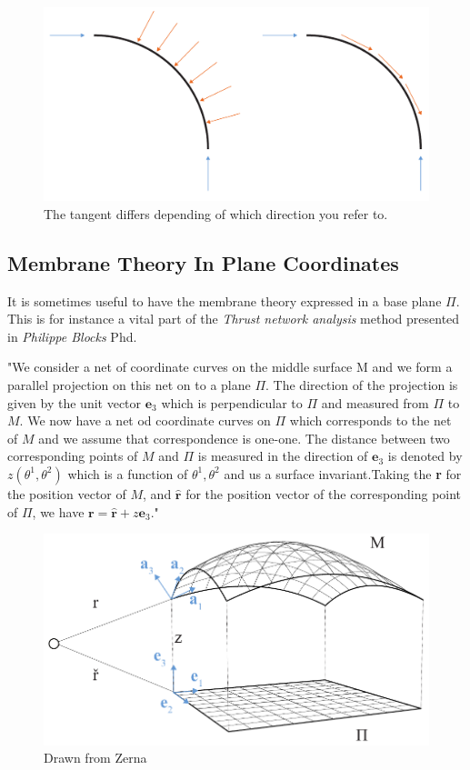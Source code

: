 \begin{figure}[H]
\centering
\includegraphics[width=0.9\linewidth ]{figure/Theory/equlibriumMem.pdf}
\caption{The tangent differs depending of which direction you refer to. }
\end{figure}

\subsection{Membrane Theory In Plane Coordinates} \label{sec:planeCoord}
It is sometimes useful to have the membrane theory expressed in a base plane $\Pi$. This is for instance a vital part of the \textit{Thrust network analysis} method presented in \textit{Philippe Blocks} Phd.

"We consider a net of coordinate curves on the middle surface M and we form a parallel projection on this net on to a plane $\Pi$. The direction of the projection is given by the unit vector $\textbf{e}_3$ which is perpendicular to $\Pi$ and measured from $\Pi$ to $M$. We now have a net od coordinate curves on $\Pi$ which corresponds to the net of $M$ and we assume that correspondence is one-one. The distance between two corresponding points of  $M$ and $\Pi$ is measured in the direction of $\textbf{e}_3$ is denoted by $z(\theta^1, \theta^2)$ which is a function of $\theta^1,\theta^2$ and us a surface invariant.Taking the \textbf{r} for the position vector of $M$, and $\hat{\textbf{r}}$ for the position vector of the corresponding point of $\Pi$, we have $\textbf{r} = \hat{\textbf{r}} + z \textbf{e}_3$."

\begin{figure}[H]
\centering
\includegraphics[width=0.9\linewidth ]{figure/Theory/planeShell.pdf}
\caption{Drawn from Zerna }
\end{figure}


